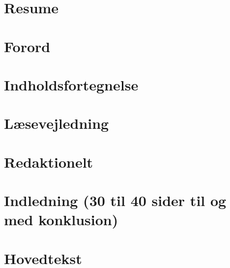 \documentclass[12pt]{report}
\begin{document}





\chapter{Resume}







\chapter{Forord}

\pagebreak






\chapter{Indholdsfortegnelse}
\makeatletter
\renewcommand\tableofcontents{%
}
\makeatother
\tableofcontents
\pagebreak






\chapter{Læsevejledning}








\chapter{Redaktionelt}








\chapter{Indledning (30 til 40 sider til og med konklusion)}







\chapter{Hovedtekst}

\end{document}
